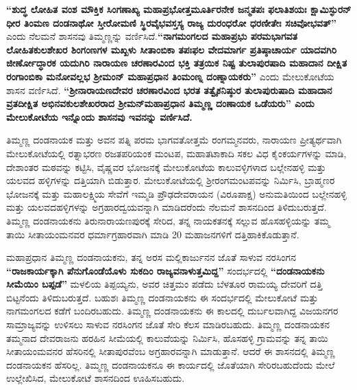 \textbf{“ಶುದ್ಧ ಲೋಹಿತ ವಂಶ ಮೌಕ್ತಿಕ ಸಿಂಗಣಾಖ್ಯ ಮಹಾಪ್ರಭೋತ್ತಮೂರ್ತಿರನೇಕ ಜನ್ಮತಪಃ ಫಲಾತಿಶಯಃ ಕ್ಷಾಮಿಸ್ಫುರನ್​ ಧೀರ ತಿಂಮಣ ದಂಡನಾಥೋ ಸ್ತೀರೋಮಣಿ ಸ್ಥಿರವೈಭವಸ್ತಸ್ಯ ರಾಜ್ಯ ದುರಂಧರೋ ಧರಣೀತೇಃ ಸಚಿವೋಭವತ್​”} ಎಂದು ನೆಲಮನೆ ಶಾಸನವು ತಿಮ್ಮಣ್ಣನ್ನು ವರ್ಣಿಸಿದೆ.\textbf{“ನಾಗಮಂಗಲದ ಮಹಾಪ್ರಭು ಪರಮಭಾಗವತ ಲೋಹಿತಕುಲಶೇಖರ ಶಿಂಗಂಣಗಳ ಮಖ್ಖಳು ಸೀತಾಂಬಿಕಾ ತಪಃಫಲ ವೇದಮಾರ್ಗ ಪ್ರತಿಷ್ಠಾಚಾರ್ಯ ಯಾದವಗಿರಿ ಜೀರ್ಣೋದ್ಧಾರಕ ಯದುಗಿರಿ ನಾರಾಯಣ ಚರಣಾರವಿಂದ ಭಕ್ತಿ ತತ್ರಯಿಕ ನಿಷ್ಟ ತುಲಾಪುರಷಾದಿ ಮಹಾದಾನ ದೀಕ್ಷಿತ ರಂಗಾಂಬಿಕಾ ಮನೋವಲ್ಲಭ ಶ‍್ರೀಮಂನ್​ ಮಹಾಪ್ರಧಾನ ತಿಂಮಂಣ್ನ ದಂಣ್ನಾಯಕರು”} ಎಂದು ಮೇಲುಕೋಟೆಯ ಶಾಸನ ವರ್ಣಿಸಿದೆ.\textbf{ “ಶ‍್ರೀನಾರಾಯಣ\-ದೇವರ ಚರಣಾರವಿಂದ ಭರತ ತತ್ವೈಕನಿಷ್ಠುರ ತುಲಾಪುರುಷಾದಿ ಮಹಾದಾನ ವ್ರತದೀಕ್ಷಿತ ಅಭಿನವಕುಲಶೇಖರರಾದ ಶ‍್ರೀಮನ್​ ಮಹಾಪ್ರಧಾನ ತಿಮ್ಮಣ್ಣ ದಂಣಾಯಕ ಒಡೆಯರು” ಎಂದು ಮೇಲುಕೋಟೆಯ ಇನ್ನೊಂದು ಶಾಸನವು ಇವನನ್ನು ವರ್ಣಿಸಿದೆ.}

ತಿಮ್ಮಣ್ಣ ದಂಡನಾಯಕ ಮತ್ತು ಅವನ ಪತ್ನಿ ಪರಮ ಭಾಗವತೋತ್ತಮೆ ರಂಗಮ್ಮನವರು, ನಾರಾಯಣ ಪ್ರೀತ್ಯರ್ಥವಾಗಿ ಮೇಲುಕೋಟೆಯಲ್ಲಿ ರತ್ನಾಭರಣ ರಜತಪರಿಯಂಕ ಮಂಟಪ, ಮಹಾತಟಾಕಾದಿ ಸಕಲ ವಿಧ ಕೈಂಕರ್ಯಗಳನ್ನು ಮಾಡಿ, ದೇಶಾಂತರ ಮಠವನ್ನು ಕಟ್ಟಿಸಿ, ವೈಷ್ಣವರ ಭೋಜನಕ್ಕೆ ಮೇಲುಕೋಟೆಯ ಕಾಲುವಳ್ಳಿಗಳಾದ ಬಲ್ಲೇನಹಳ್ಳಿ ಮತ್ತು ಯಲವದ ಹಳ್ಳಿಗಳನ್ನು ದತ್ತಿಯಾಗಿ ಬಿಡುತ್ತಾರ. ಮೇಲುಕೋಟೆಯಲ್ಲಿ ಶ‍್ರೀರಂಗಮಂಟಪವನ್ನು ನಿರ್ಮಿಸಿ, ಬ್ರಾಹ್ಮಣರ ಭೋಜನಕ್ಕೆ ಮತ್ತು ಮಹಾಲಕ್ಷ್ಮಿಯ ಸೇವೆಗೆ ಇಮ್ಮಡಿ ಪ್ರೌಢದೇವರಾಯನ (ವಿರೂಪಾಕ್ಷ) ಅನುಮತಿಯಿಂದ ಬಲ್ಲೇನಹಳ್ಳಿ ಮತ್ತು ಯಲವದಹಳ್ಳಿಗಳನ್ನು ಅಗ್ರಹಾರದ್ವಯವನ್ನಾಗಿ ಮಾಡಿದರೆಂದು ನೆಲಮನೆ ಶಾಸನದಿಂದ ತಿಳಿದುಬರುತ್ತದೆ. ತಿಮ್ಮಣ್ಣ ದಂಡನಾಯಕನು ತಿರುನಾರಾಯಣಪುರಕ್ಕೆ ಸೇರಿದ, ತನ್ನ ನಾಯಕತನಕ್ಕೆ ಸಲ್ಲುವ ಹೊಸಹಳ್ಳಿಯನ್ನು ತಮ್ಮ ತಾಯಿ ಸೀತಾಯಂಮ\-ನವರ ಧರ್ಮಾಗ್ರಹಾರವಾಗಿ ಮಾಡಿ 20 ಮಹಾಜನಗಳಿಗೆ ದತ್ತಿಹಾಕಿಕೊಡುತ್ತಾನೆ.

ಮಹಾಪ್ರಧಾನ ತಿಮ್ಮಣ್ಣ ದಂಡನಾಯಕನು, ತನ್ನ ಅರಸ ಮಲ್ಲಿಕಾರ್ಜುನನ ಜೊತೆ ಸಾಳುವ ನರಸಿಂಗನ \textbf{“ರಾಜಕಾರ್ಯ\-ಕ್ಕಾಗಿ ಪೆನುಗೊಂಡೆಯೊಳು ಸುಕದಿಂ ರಾಜ್ಯವನಾಳುತ್ತಮಿದ್ದ”} ಸಂದರ್ಭದಲ್ಲಿ \textbf{“ದಂಡನಾಯಕನು ಸೀಮೆಯಿಂ ಬಪ್ಪಡೆ”} ಮಳಲಿಯ ತಿಪ್ಪಯ್ಯನು, ಅವರ ಚಿತ್ತಮಂ ಪಡೆದು ಬೆಳತೂರ ರಾಮಯ್ಯ ದೇವರಿಗೆ ದತ್ತಿ ಬಿಟ್ಟನೆಂದು ತಿಳಿದುಬರುತ್ತದೆ. ಬಹುಶಃ ತಿಮ್ಮಣ್ಣ ದಂಡನಾಯಕನು ಈ ಸಂದರ್ಭದಲ್ಲಿ ಮೇಲುಕೋಟೆ ಮತ್ತು ನಾಗಮಂಗಲದ ಕಡೆಗೆ ಬಂದಿರಬಹುದು. ತಿಮ್ಮಣ್ಣ ದಂಡನಾಯಕನು ಈ ಕಾಲದಲ್ಲಿ ದುರ್ಬಲವಾಗಿದ್ದ ವಿಜಯನಗರ ಸಾಮ್ರಾಜ್ಯವನ್ನು ಉಳಿಸಲು ಸಾಳುವ ನರಸಿಂಗನ ಜೊತೆ ಸೇರಿ ಕೆಲಸ ಮಾಡಿರಬಹುದು. ತಿಮ್ಮಣ್ಣ ದಂಡನಾಯಕನ ತಮ್ಮನಾದ ದೇವರಾಜನು ಹರಹಿನ ಸೀಮೆಯಲ್ಲಿ ಕಾಲುವೆಯನ್ನು ನಿರ್ಮಿಸಿ, ಹೊಸಹಳ್ಳಿ ಗ್ರಾಮವನ್ನು ತನ್ನ ತಾಯಿ ಸೀತಾಯಂಮವನರ ಹೆಸರಿನಲ್ಲಿ ಸೀತಾಪುರವೆಂಬ ಅಗ್ರಹಾರವನ್ನಾಗಿ ಮಾಡುತ್ತಾನೆ. ಆದರೆ ಈ ಶಾಸನದಲ್ಲಿ ತಿಮ್ಮಣ್ಣ ದಂಡನಾಯಕನ ಹೆಸರಿಲ್ಲ. ತಿಮ್ಮಣ್ಣ ದಂಡನಾಯಕನೂ ಈ ಕಾರ್ಯದಲ್ಲಿ ಜೊತೆಯಾಗಿ ಸೇರಿರಬಹುದೆಂದು ಮೇಲೆ ಉಲ್ಲೇಖಿಸಿದ, ಮೇಲುಕೋಟೆ ಶಾಸನದಿಂದ ಊಹಿಸಬಹುದು.

